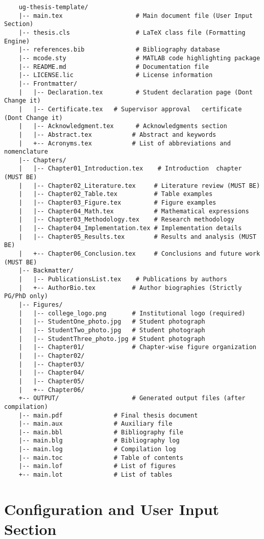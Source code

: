 \begin{verbatim}
	ug-thesis-template/
	|-- main.tex                    # Main document file (User Input Section)
	|-- thesis.cls                  # LaTeX class file (Formatting Engine)
	|-- references.bib              # Bibliography database
	|-- mcode.sty                   # MATLAB code highlighting package
	|-- README.md                   # Documentation file
	|-- LICENSE.lic                 # License information
	|-- Frontmatter/
	|   |-- Declaration.tex         # Student declaration page (Dont Change it) 
	|   |-- Certificate.tex   # Supervisor approval   certificate (Dont Change it)
	|   |-- Acknowledgment.tex      # Acknowledgments section
	|   |-- Abstract.tex           # Abstract and keywords
	|   +-- Acronyms.tex           # List of abbreviations and nomenclature
	|-- Chapters/
	|   |-- Chapter01_Introduction.tex    # Introduction  chapter (MUST BE)
	|   |-- Chapter02_Literature.tex     # Literature review (MUST BE)
	|   |-- Chapter02_Table.tex          # Table examples
	|   |-- Chapter03_Figure.tex         # Figure examples
	|   |-- Chapter04_Math.tex           # Mathematical expressions
	|   |-- Chapter03_Methodology.tex    # Research methodology
	|   |-- Chapter04_Implementation.tex # Implementation details
	|   |-- Chapter05_Results.tex        # Results and analysis (MUST BE)
	|   +-- Chapter06_Conclusion.tex     # Conclusions and future work (MUST BE)
	|-- Backmatter/
	|   |-- PublicationsList.tex    # Publications by authors
	|   +-- AuthorBio.tex          # Author biographies (Strictly PG/PhD only)
	|-- Figures/
	|   |-- college_logo.png       # Institutional logo (required)
	|   |-- StudentOne_photo.jpg   # Student photograph
	|   |-- StudentTwo_photo.jpg   # Student photograph
	|   |-- StudentThree_photo.jpg # Student photograph
	|   |-- Chapter01/             # Chapter-wise figure organization
	|   |-- Chapter02/
	|   |-- Chapter03/
	|   |-- Chapter04/
	|   |-- Chapter05/
	|   +-- Chapter06/
	+-- OUTPUT/                    # Generated output files (after compilation)
	|-- main.pdf              # Final thesis document
	|-- main.aux              # Auxiliary file
	|-- main.bbl              # Bibliography file
	|-- main.blg              # Bibliography log
	|-- main.log              # Compilation log
	|-- main.toc              # Table of contents
	|-- main.lof              # List of figures
	+-- main.lot              # List of tables
\end{verbatim}

\section{Configuration and User Input Section}
\label{sec:configuration}

